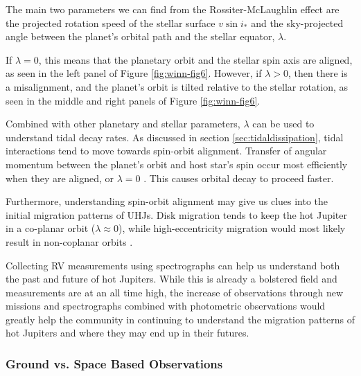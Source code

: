 \documentclass[oneside,12pt]{amsart}
\numberwithin{page}{section}
\begin{document}
The main two parameters we can find from the Rossiter-McLaughlin effect are the projected rotation speed of the stellar surface $v \sin i_*$ and the sky-projected angle between the planet's orbital path and the stellar equator, $\lambda$.

If $\lambda = 0$, this means that the planetary orbit and the stellar spin axis are aligned, as seen in the left panel of Figure \ref{fig:winn-fig6}. However, if $\lambda > 0$, then there is a misalignment, and the planet's orbit is tilted relative to the stellar rotation, as seen in the middle and right panels of Figure \ref{fig:winn-fig6}.

Combined with other planetary and stellar parameters, $\lambda$ can be used to understand tidal decay rates. As discussed in section \ref{sec:tidaldissipation}, tidal interactions tend to move towards spin-orbit alignment. Transfer of angular momentum between the planet's orbit and host star's spin occur most efficiently when they are aligned, or $\lambda = 0$ \citet{ogilvie2014tidal}. This causes orbital decay to proceed faster.

Furthermore, understanding spin-orbit alignment may give us clues into the initial migration patterns of UHJs. Disk migration tends to keep the hot Jupiter in a co-planar orbit ($\lambda \approx 0$), while high-eccentricity migration would most likely result in non-coplanar orbits \citep{triaud2017rossiter}.

Collecting RV measurements using spectrographs can help us understand both the past and future of hot Jupiters. While this is already a bolstered field and measurements are at an all time high, the increase of observations through new missions and spectrographs combined with photometric observations would greatly help the community in continuing to understand the migration patterns of hot Jupiters and where they may end up in their futures.


\clearpage

\subsubsection{Ground vs. Space Based Observations}
\end{document}
